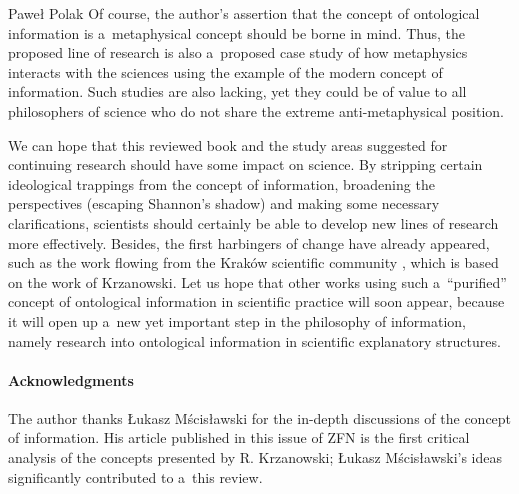 \begin{newrevengenv}{Paweł Polak}
Of course, the author's assertion that the concept of ontological information is a~metaphysical concept should be borne in mind. Thus, the proposed line of research is also a~proposed case study of how metaphysics interacts with the sciences using the example of the modern concept of information. Such studies are also lacking, yet they could be of value to all philosophers of science who do not share the extreme anti-metaphysical position.

We can hope that this reviewed book and the study areas suggested for continuing research should have some impact on science. By stripping certain ideological trappings from the concept of information, broadening the perspectives (escaping Shannon's shadow) and making some necessary clarifications, scientists should certainly be able to develop new lines of research more effectively. Besides, the first harbingers of change have already appeared, such as the work flowing from the Kraków scientific community
\parencite[][]{bielecki_information_2022}, %
 which is based on the work of Krzanowski. Let us hope that other works using such a~``purified'' concept of ontological information in scientific practice will soon appear, because it will open up a~new yet important step in the philosophy of information, namely research into ontological information in scientific explanatory structures.

\paragraph{Acknowledgments}

The author thanks Łukasz Mścisławski for the in-depth discussions of the concept of information. His article
\parencite[][]{mscislawski_is_2022} %
 published in this issue of ZFN is the first critical analysis of the concepts presented by R. Krzanowski; Łukasz Mścisławski's ideas significantly contributed to a~this review.


\end{newrevengenv}
